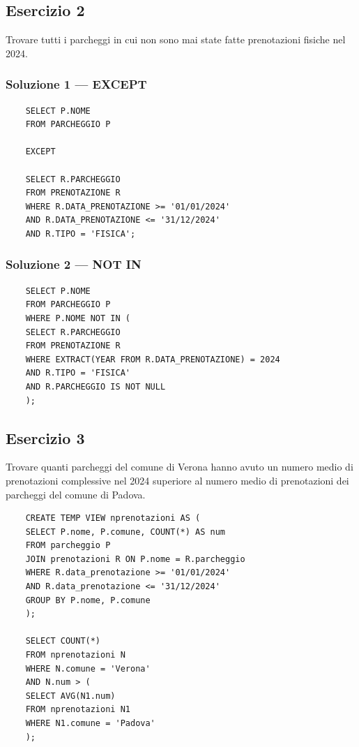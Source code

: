 \subsection{Esercizio 2}

Trovare tutti i parcheggi in cui non sono mai state fatte prenotazioni fisiche nel 2024.

\subsubsection*{Soluzione 1 — EXCEPT}

\begin{verbatim}
	SELECT P.NOME
	FROM PARCHEGGIO P
	
	EXCEPT
	
	SELECT R.PARCHEGGIO
	FROM PRENOTAZIONE R
	WHERE R.DATA_PRENOTAZIONE >= '01/01/2024'
	AND R.DATA_PRENOTAZIONE <= '31/12/2024'
	AND R.TIPO = 'FISICA';
\end{verbatim}

\subsubsection*{Soluzione 2 --- NOT IN}

\begin{verbatim}
	SELECT P.NOME
	FROM PARCHEGGIO P
	WHERE P.NOME NOT IN (
	SELECT R.PARCHEGGIO
	FROM PRENOTAZIONE R
	WHERE EXTRACT(YEAR FROM R.DATA_PRENOTAZIONE) = 2024
	AND R.TIPO = 'FISICA'
	AND R.PARCHEGGIO IS NOT NULL
	);
\end{verbatim}
\subsection{Esercizio 3}

Trovare quanti parcheggi del comune di Verona hanno avuto un numero medio di prenotazioni complessive nel 2024 superiore al numero medio di prenotazioni dei parcheggi del comune di Padova.

\begin{verbatim}
	CREATE TEMP VIEW nprenotazioni AS (
	SELECT P.nome, P.comune, COUNT(*) AS num
	FROM parcheggio P
	JOIN prenotazioni R ON P.nome = R.parcheggio
	WHERE R.data_prenotazione >= '01/01/2024'
	AND R.data_prenotazione <= '31/12/2024'
	GROUP BY P.nome, P.comune
	);
	
	SELECT COUNT(*)
	FROM nprenotazioni N
	WHERE N.comune = 'Verona'
	AND N.num > (
	SELECT AVG(N1.num)
	FROM nprenotazioni N1
	WHERE N1.comune = 'Padova'
	);
\end{verbatim}